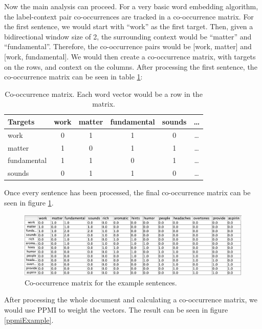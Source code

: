Now the main analysis can proceed. For a very basic word embedding algorithm, the label-context pair co-occurrences are tracked in a co-occurrence matrix. For the first sentence, we would start with ``work'' as the first target. Then, given a bidirectional window size of 2, the surrounding context would be ``matter'' and ``fundamental''. Therefore, the co-occurrence pairs would be [work, matter] and [work, fundamental]. We would then create a co-occurrence matrix, with targets on the rows, and context on the columns.  After processing the first sentence, the co-occurrence matrix can be seen in table \ref{exampleCoocmat}:

\begin{table}[h]
    \centering
    \begin{tabular}{|l|c|c|c|c|c|}
    \hline
    Targets & work & matter & fundamental & sounds & \dots \\
    \hline
    work & 0 & 1 & 1 & 0 & \dots \\
    \hline
    matter & 1 & 0 & 1 & 1 & \dots \\
    \hline
    fundamental & 1 & 1 & 0 & 1 & \dots \\
    \hline
    sounds & 0 & 1 & 1 & 0 & \dots \\
    \hline
    \end{tabular}
    \caption{Co-occurrence matrix. Each word vector would be a row in the matrix.}
    \label{exampleCoocmat}
\end{table}

Once every sentence has been processed, the final co-occurrence matrix can be seen in figure \ref{coocExample}.

\begin{figure}[h]
    \centering
    \includegraphics[scale=.5]{./images/full_cooc_matrix.png}
    \caption[Generated using Simbrain.]{Co-occurrence matrix for the example sentences.}
 \label{coocExample}
\end{figure}

After processing the whole document and calculating a co-occurrence matrix, we would use PPMI to weight the vectors. The result can be seen in figure \ref{ppmiExample}.

